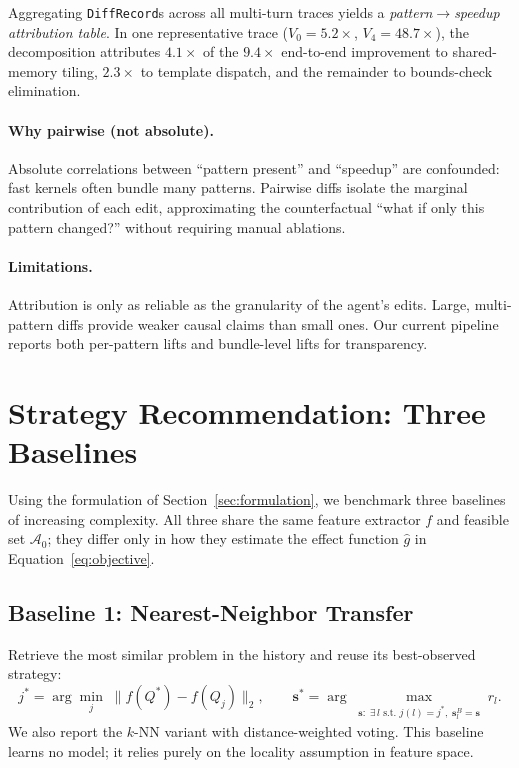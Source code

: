 \documentclass{article}
\begin{document}
Aggregating \texttt{DiffRecord}s across all multi-turn traces yields a \emph{pattern$\to$speedup attribution table}. In one representative trace ($V_0 = 5.2\times$, $V_4 = 48.7\times$), the decomposition attributes $4.1\times$ of the $9.4\times$ end-to-end improvement to shared-memory tiling, $2.3\times$ to template dispatch, and the remainder to bounds-check elimination.

\paragraph{Why pairwise (not absolute).}
Absolute correlations between ``pattern present'' and ``speedup'' are confounded: fast kernels often bundle many patterns. Pairwise diffs isolate the marginal contribution of each edit, approximating the counterfactual ``what if only this pattern changed?'' without requiring manual ablations.

\paragraph{Limitations.}
Attribution is only as reliable as the granularity of the agent's edits. Large, multi-pattern diffs provide weaker causal claims than small ones. Our current pipeline reports both per-pattern lifts and bundle-level lifts for transparency.

\section{Strategy Recommendation: Three Baselines}
\label{sec:strategy}

Using the formulation of Section~\ref{sec:formulation}, we benchmark
three baselines of increasing complexity. All three share the same
feature extractor $f$ and feasible set $\mathcal{A}_0$; they differ
only in how they estimate the effect function $\hat{g}$ in
Equation~\eqref{eq:objective}.

\subsection{Baseline 1: Nearest-Neighbor Transfer}
\label{sec:bl1}
Retrieve the most similar problem in the history and reuse its
best-observed strategy:
\begin{equation}
j^* = \arg\min_{j}\;\bigl\lVert f(Q^*) - f(Q_j)\bigr\rVert_2,
\qquad
\mathbf{s}^* = \arg\max_{\substack{\mathbf{s}:\;\exists\,l \text{ s.t. } j(l)=j^*,\; \mathbf{s}_l^B = \mathbf{s}}} r_l.
\label{eq:nn}
\end{equation}
We also report the $k$-NN variant with distance-weighted voting. This
baseline learns no model; it relies purely on the locality assumption
in feature space.
\end{document}
